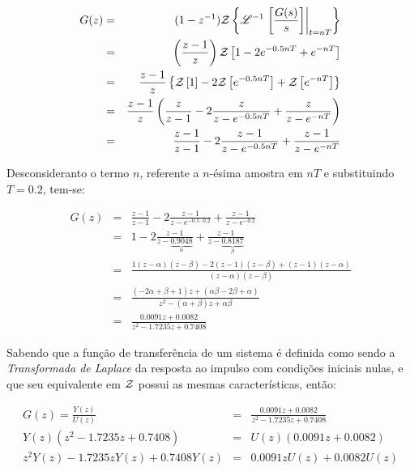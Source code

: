 \begin{eqnarray}
G(z) & = & (1 - z^{-1})
           \mathcal{Z}\left\{\mathscr{L}^{-1}\left.\left[\frac{G(s)}{s}\right]
                                  \right|_{t = nT}\right\}\nonumber\\
& = & \left(\frac{z-1}{z}\right)
      \mathcal{Z}\left[1 - 2e^{-0.5nT} + e^{-nT}\right]\nonumber\\
& = & \frac{z-1}{z}\left\{\mathcal{Z}\left[1\right] - 
                          2\mathcal{Z}\left[e^{-0.5nT}\right] + 
                          \mathcal{Z}\left[e^{-nT}\right]\right\}\nonumber\\
& = & \frac{z-1}{z}\left(\frac{z}{z-1} - 
                           2\frac{z}{z-e^{-0.5nT}} + 
                           \frac{z}{z - e^{-nT}} \right)\nonumber\\
& = & \frac{z-1}{z-1} - 
      2\frac{z-1}{z-e^{-0.5nT}} + 
      \frac{z-1}{z - e^{-nT}}\nonumber\\
\end{eqnarray}

Desconsideranto o termo $n$, referente a $n$-ésima amostra em $nT$ e
substituindo $T = 0.2$, tem-se:

\begin{eqnarray}
G(z) & = & \frac{z-1}{z-1} - 
           2\frac{z-1}{z-e^{-0.5 \cdotp 0.2}} + 
           \frac{z-1}{z-e^{-0.2}}\nonumber\\
& = & 1 - 
      2\frac{z-1}{z-\underbrace{0.9048}_{\alpha}} + 
      \frac{z-1}{z-\underbrace{0.8187}_{\beta}}\nonumber\\
& = & \frac{1(z-\alpha)(z-\beta)-2(z-1)(z-\beta)+(z-1)(z-\alpha)}
           {(z-\alpha)(z-\beta)}\nonumber\\
& = & \frac{(-2\alpha + \beta + 1)z + (\alpha\beta - 2\beta + \alpha)}
           {z^2 - (\alpha+\beta)z + \alpha\beta}\nonumber\\
& = & \frac{0.0091z + 0.0082}{z^2 - 1.7235z + 0.7408}
\end{eqnarray}

Sabendo que a função de transferência de um sistema é definida como sendo a {\it
Transformada de Laplace} da resposta ao impulso com condições iniciais nulas, e
que seu equivalente em $\mathcal{Z}$ possui as mesmas características, então:

\begin{eqnarray}
G(z) = \frac{Y(z)}{U(z)} & = & \frac{0.0091z + 0.0082}
                                    {z^2 - 1.7235z + 0.7408}\nonumber\\
Y(z)(z^2 - 1.7235z + 0.7408) & = & U(z)(0.0091z + 0.0082)\nonumber\\
z^2Y(z) - 1.7235zY(z) + 0.7408Y(z) & = & 0.0091zU(z) +
                                        0.0082U(z)\label{eq:sist_z}
\end{eqnarray}

